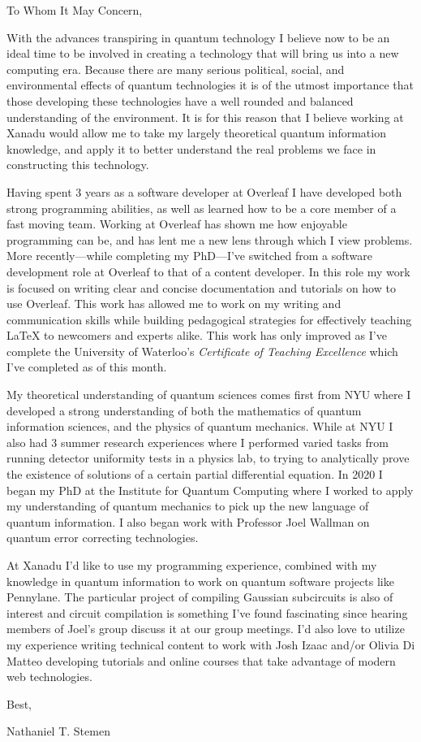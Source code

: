 \documentclass[12pt]{article}
\begin{document}
\noindent
To Whom It May Concern,

\noindent
With the advances transpiring in quantum technology I believe now to be an ideal time to be involved in creating a technology that will bring us into a new computing era.
Because there are many serious political, social, and environmental effects of quantum technologies it is of the utmost importance that those developing these technologies have a well rounded and balanced understanding of the environment.
It is for this reason that I believe working at Xanadu would allow me to take my largely theoretical quantum information knowledge, and apply it to better understand the real problems we face in constructing this technology.

Having spent 3 years as a software developer at Overleaf I have developed both strong programming abilities, as well as learned how to be a core member of a fast moving team.
Working at Overleaf has shown me how enjoyable programming can be, and has lent me a new lens through which I view problems.
More recently---while completing my PhD---I've switched from a software development role at Overleaf to that of a content developer.
In this role my work is focused on writing clear and concise documentation and tutorials on how to use Overleaf.
This work has allowed me to work on my writing and communication skills while building pedagogical strategies for effectively teaching \LaTeX{} to newcomers and experts alike.
This work has only improved as I've complete the University of Waterloo's \emph{Certificate of Teaching Excellence} which I've completed as of this month.

My theoretical understanding of quantum sciences comes first from NYU where I developed a strong understanding of both the mathematics of quantum information sciences, and the physics of quantum mechanics.
While at NYU I also had 3 summer research experiences where I performed varied tasks from running detector uniformity tests in a physics lab, to trying to analytically prove the existence of solutions of a certain partial differential equation.
In 2020 I began my PhD at the Institute for Quantum Computing where I worked to apply my understanding of quantum mechanics to pick up the new language of quantum information.
I also began work with Professor Joel Wallman on quantum error correcting technologies.

At Xanadu I'd like to use my programming experience, combined with my knowledge in quantum information to work on quantum software projects like Pennylane.
The particular project of compiling Gaussian subcircuits is also of interest and circuit compilation is something I've found fascinating since hearing members of Joel's group discuss it at our group meetings.
I'd also love to utilize my experience writing technical content to work with Josh Izaac and/or Olivia Di Matteo developing tutorials and online courses that take advantage of modern web technologies.

\noindent
Best,

Nathaniel T. Stemen
\end{document}
